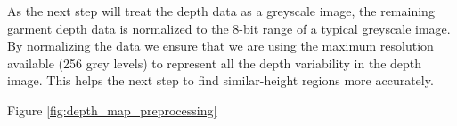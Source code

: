 As the next step will treat the depth data as a greyscale image, the remaining garment depth data is normalized to the 8-bit range of a typical greyscale image. By normalizing the data we ensure that we are using the maximum resolution available (256 grey levels) to represent all the depth variability in the depth image. This helps the next step to find similar-height regions more accurately.

Figure \ref{fig:depth_map_preprocessing} \comment{[...]}


